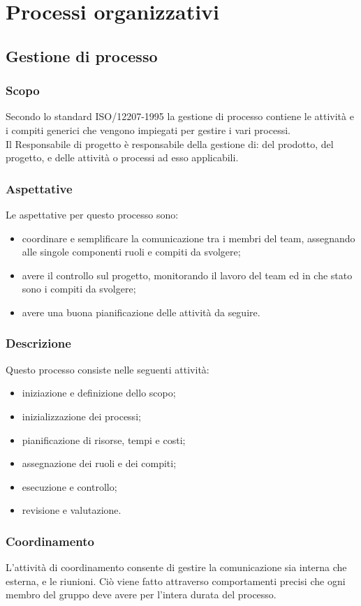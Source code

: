 \section{Processi organizzativi}
\subsection{Gestione di processo}
\subsubsection{Scopo}
Secondo lo standard ISO/12207-1995 la gestione di processo contiene le attività e i compiti generici che vengono impiegati per gestire i vari processi.\\
Il Responsabile di progetto è responsabile della gestione di: del prodotto, del progetto, e delle attività o processi ad esso applicabili.
\subsubsection{Aspettative}
Le aspettative per questo processo sono:
\begin{itemize}
    \item coordinare e semplificare la comunicazione tra i membri del team, assegnando alle singole componenti ruoli e compiti da svolgere;
    \item avere il controllo sul progetto, monitorando il lavoro del team ed in che stato sono i compiti da svolgere;
    \item avere una buona pianificazione delle attività da seguire.
\end{itemize}
\subsubsection{Descrizione}
Questo processo consiste nelle seguenti attività:
\begin{itemize}
    \item iniziazione e definizione dello scopo;
    \item inizializzazione dei processi;
    \item pianificazione di risorse, tempi e costi; 
    \item assegnazione dei ruoli e dei compiti;
    \item esecuzione e controllo;
    \item revisione e valutazione.    
\end{itemize}
\subsubsection{Coordinamento}
L'attività di coordinamento consente di gestire la comunicazione sia interna che esterna, e le riunioni. Ciò viene fatto attraverso comportamenti precisi che ogni membro del gruppo deve avere per l'intera durata del processo.
